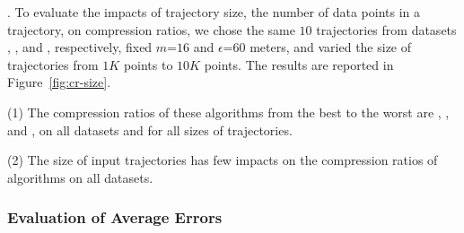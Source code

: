 .
To evaluate the impacts of trajectory size, \ie the number of data points in a trajectory, on compression ratios,
we chose the same {$10$} trajectories from {datasets \sercar, \geolife, \mopsi and \pricar}, respectively,
fixed {$m$=$16$} and $\epsilon$=$60$ meters, and varied the size  of trajectories from $1K$ points to $10K$ points.
%
The results are reported in Figure~\ref{fig:cr-size}.

\ni(1) The compression ratios of these algorithms from the best to the worst are \cista, \dps, \cist and \squishe, on all datasets and for all sizes of trajectories. %

\ni(2) The size of input trajectories has few impacts on the compression ratios of \lsa algorithms on all datasets.





\subsubsection{Evaluation of Average Errors}



